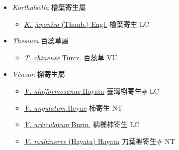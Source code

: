 
  \begin{itemize}
 \item[] \textit{Korthalsella} 檜葉寄生屬
                    
  \begin{itemize}
        \item[] \href{http://www.theplantlist.org/tpl1.1/search?q=Korthalsella+japonica}{\textit{K. japonica} (Thunb.) Engl.}   檜葉寄生 LC
  \end{itemize}
 \item[] \textit{Thesium} 百蕊草屬
                    
  \begin{itemize}
        \item[] \href{http://www.theplantlist.org/tpl1.1/search?q=Thesium+chinense}{\textit{T. chinense} Turcz.}   百蕊草 VU
  \end{itemize}
 \item[] \textit{Viscum} 槲寄生屬
                    
  \begin{itemize}
        \item[] \href{http://www.theplantlist.org/tpl1.1/search?q=Viscum+alniformosanae}{\textit{V. alniformosanae} Hayata}   臺灣槲寄生\# LC
        \item[] \href{http://www.theplantlist.org/tpl1.1/search?q=Viscum+angulatum}{\textit{V. angulatum} Heyne}   柿寄生 NT
        \item[] \href{http://www.theplantlist.org/tpl1.1/search?q=Viscum+articulatum}{\textit{V. articulatum} Burm.}   椆櫟柿寄生 LC
        \item[] \href{http://www.theplantlist.org/tpl1.1/search?q=Viscum+multinerve}{\textit{V. multinerve} (Hayata) Hayata}   刀葉槲寄生\# NT
  \end{itemize}
  \end{itemize}
